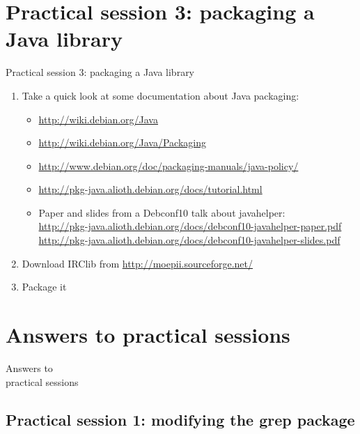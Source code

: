 \documentclass[10pt,final]{beamer}
\begin{document}
\section{Practical session 3: packaging a Java library}
\begin{frame}{Practical session 3: packaging a Java library}
\begin{enumerate}
	\item Take a quick look at some documentation about Java packaging:\\
		\begin{itemize}
		\item \url{http://wiki.debian.org/Java}
      \hbr
		\item \url{http://wiki.debian.org/Java/Packaging}
      \hbr
		\item \url{http://www.debian.org/doc/packaging-manuals/java-policy/}
      \hbr
		\item \url{http://pkg-java.alioth.debian.org/docs/tutorial.html}
      \hbr
		\item Paper and slides from a Debconf10 talk about javahelper:\\
			{\footnotesize
			\url{http://pkg-java.alioth.debian.org/docs/debconf10-javahelper-paper.pdf}\\
			\url{http://pkg-java.alioth.debian.org/docs/debconf10-javahelper-slides.pdf}}
		\end{itemize}
		\br
	\item Download IRClib from \url{http://moepii.sourceforge.net/}
		\br
	\item Package it
\end{enumerate}
\end{frame}

\section{Answers to practical sessions}

\begin{frame}
	\begin{center}
		\LARGE Answers to\\[0.5em]  practical sessions
	\end{center}
\end{frame}


\subsection{Practical session 1: modifying the grep package}
\end{document}
